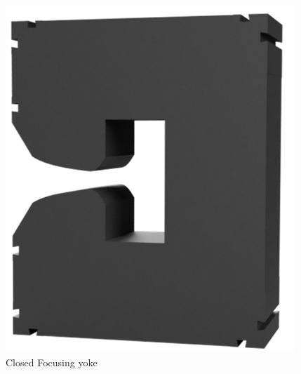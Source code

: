 \documentclass[a4paper,
               biblatex,     %
               keeplastbox,   %
               ]{jacow}
\begin{document}
\begin{figure}[!htb]
  \centering
  \begin{minipage}[b]{0.45\columnwidth}
    \includegraphics*[width=\textwidth]{focusing}
    \caption{Closed Focusing yoke}
    \label{fig:focusing}
  \end{minipage}
  \hfill
  \begin{minipage}[b]{0.45\columnwidth}

\end{minipage}
\end{figure}
\end{document}
